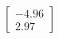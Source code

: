 \documentclass[preview]{standalone}
\begin{document}
\begin{align*}
\begin{bmatrix} -4.96 \\ 2.97 \end{bmatrix}
\end{align*}
\end{document}
